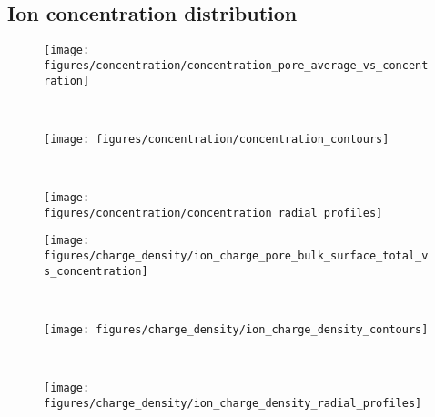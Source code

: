 \documentclass[twoside,twocolumn,9pt]{article}
\begin{document}

\subsection{Ion concentration distribution}\label{sec:ionc}
%

\begin{figure*}[!t]
  \centering
  \begin{minipage}[t]{8cm}
    \begin{subfigure}[t]{8cm}
      \centering
      \caption{}\vspace{-3mm}\label{fig:concentration_pore_average_vs_cbulk}
      \texttt{[image: figures/concentration/concentration\_pore\_average\_vs\_concentration]}
    \end{subfigure}
    \\
    \begin{subfigure}[t]{8cm}
      \centering
      \caption{}\vspace{-3mm}\label{fig:concentration_contours}
      \texttt{[image: figures/concentration/concentration\_contours]}
    \end{subfigure}
    \\
    \begin{subfigure}[t]{8cm}
      \centering
      \caption{}\vspace{-3mm}\label{fig:concentration_radial_profiles}
      \texttt{[image: figures/concentration/concentration\_radial\_profiles]}
    \end{subfigure}
  \end{minipage}
  \begin{minipage}[t]{8cm}
    \begin{subfigure}[t]{8cm}
      \centering
      \caption{}\vspace{-3mm}\label{fig:ion_charge_dist_vs_cbulk}
      \texttt{[image: figures/charge\_density/ion\_charge\_pore\_bulk\_surface\_total\_vs\_concentration]}
    \end{subfigure}
    \\
    \begin{subfigure}[t]{8cm}
      \centering
      \caption{}\vspace{-3mm}\label{fig:ion_scd_contours}
      \texttt{[image: figures/charge\_density/ion\_charge\_density\_contours]}
    \end{subfigure}
    \\
    \begin{subfigure}[t]{8cm}
      \centering
      \caption{}\vspace{-3mm}\label{fig:ion_scd_radial_profiles}
      \texttt{[image: figures/charge\_density/ion\_charge\_density\_radial\_profiles]}
    \end{subfigure}
  \end{minipage}


\end{figure*}
\end{document}
